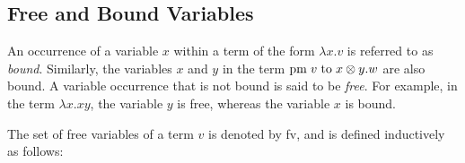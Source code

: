 
\subsection{Free and Bound Variables}
An occurrence of a variable $x$ within a term of the form $\lambda x.v$ is referred to as \emph{bound}.  Similarly, the variables $x$ and $y$ in the term $\text{pm} \hspace{3 pt} v \hspace{3 pt} \text{to} \hspace{3 pt} x \otimes y. w$ are also bound. A variable occurrence that is not bound is said to be \emph{free}. For example, in the term $\lambda x.xy$, the variable $y$ is free, whereas the variable $x$ is bound.  

The set of free variables of a term $v$ is denoted by \gls{fv}, and is defined inductively as follows:

\begin{comment}
\begin{equation*}
\begin{split}
FV(x) &= \{x\}, &  FV(*) &= \emptyset,  \\
FV(f(v_1, \ldots, v_n)), &= FV(v_1) \cup \ldots \cup FV(v_n)& FV(\lambda x: \mathbb{A}. v) &= FV(v) \backslash \{x\}, \\
FV(v w) &= FV(v) \cup FV(w), & FV(v \otimes w) &= FV(v) \cup FV(w), \\
FV(\text{pm} \hspace{3 pt} v \hspace{3 pt} \text{to} \hspace{3 pt} x \otimes y. w), &= FV(v) \cup (FV(w)  \backslash \{x,y\}) & FV(\text{dis}(v)) &= FV(v),\\
FV(v \text{ to } *.w) &= FV(v) \cup FV(w)  &  FV(\text{inl}_\typeB) &=  FV(v). \\
\end{split}
\end{equation*}
\end{comment}

